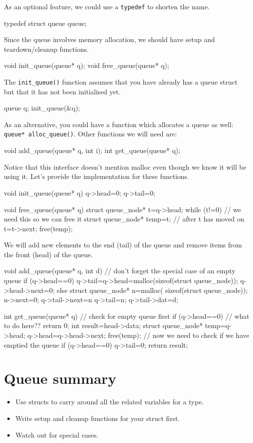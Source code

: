 As an optional feature, we could use a \texttt{typedef} to shorten the name.
\begin{codeblock}
typedef struct queue queue;
\end{codeblock}

Since the queue involves memory allocation, we should have setup and teardown/cleanup functions.
\begin{codeblock}
void init_queue(queue* q);
void free_queue(queue* q);
\end{codeblock}
The \lstinline!init_queue()! function assumes that you have already has a queue struct but that it has not been initialised yet.
\begin{codeblock}
queue q;
init_queue(&q);
\end{codeblock}

As an alternative, you could have a function which allocates a queue as well: \lstinline!queue* alloc_queue()!.
Other functions we will need are:
\begin{codeblock}
void add_queue(queue* q, int i);
int get_queue(queue* q);
\end{codeblock}

Notice that this interface doesn't mention malloc even though we know it will be using it.
Let's provide the implementation for these functions.
\begin{codeblock}
void init_queue(queue* q) {
    q->head=0;
    q->tail=0;
}

void free_queue(queue* q) {
    struct queue_node* t=q->head;
    while (t!=0) {
	    // we need this so we can free it
        struct queue_node* temp=t; // after t has moved on
        t=t->next;		
        free(temp);
    }
}
\end{codeblock}

We will add new elements to the end (tail) of the queue and remove items from the front (head) of the queue.
\begin{codeblock}
void add_queue(queue* q, int d) {
      // don't forget the special case of an empty queue
    if (q->head==0) {	
        q->tail=q->head=malloc(sizeof(struct queue_node));
        q->head->next=0;
    } else {
	struct queue_node* n=malloc(
	    sizeof(struct queue_node));
	n->next=0;
	q->tail->next=n
	q->tail=n;
    }
    q->tail->dat=d;
}

int get_queue(queue* q) {
	// check for empty queue first
    if (q->head==0) {
	  // what to do here??
	return 0;
    }
    int result=head->data;
    struct queue_node* temp=q->head;
    q->head=q->head->next;
    free(temp);
      // now we need to check if we have emptied the queue
    if (q->head==0) {
        q->tail=0;
    }
    return result;
}

\end{codeblock}









\section*{Queue summary}
\begin{itemize}
 \item Use structs to carry around all the related variables for a type.
 \item Write setup and cleanup functions for your struct first.
 \item Watch out for special cases.
\end{itemize}
